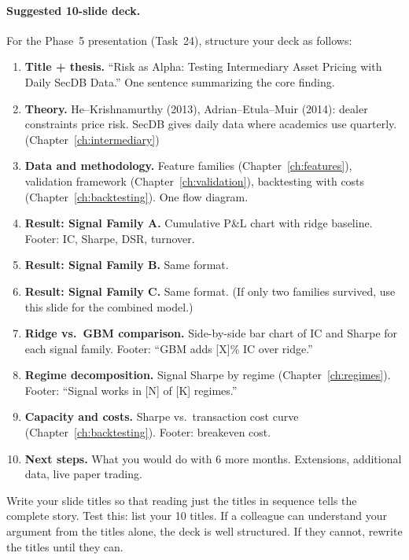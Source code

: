 \paragraph{Suggested 10-slide deck.}
For the Phase~5 presentation (Task~24), structure your deck as follows:

\begin{enumerate}[leftmargin=1.5em]
  \item \textbf{Title + thesis.}  ``Risk as Alpha: Testing Intermediary
    Asset Pricing with Daily SecDB Data.''  One sentence summarizing the
    core finding.
  \item \textbf{Theory.}  He--Krishnamurthy (2013), Adrian--Etula--Muir
    (2014): dealer constraints price risk.  SecDB gives daily data where
    academics use quarterly.  (Chapter~\ref{ch:intermediary})
  \item \textbf{Data and methodology.}  Feature families
    (Chapter~\ref{ch:features}), validation framework
    (Chapter~\ref{ch:validation}), backtesting with costs
    (Chapter~\ref{ch:backtesting}).  One flow diagram.
  \item \textbf{Result: Signal Family A.}  Cumulative P\&L chart with
    ridge baseline.  Footer: IC, Sharpe, DSR, turnover.
  \item \textbf{Result: Signal Family B.}  Same format.
  \item \textbf{Result: Signal Family C.}  Same format.  (If only two
    families survived, use this slide for the combined model.)
  \item \textbf{Ridge vs.\ GBM comparison.}  Side-by-side bar chart of
    IC and Sharpe for each signal family.  Footer: ``GBM adds [X]\% IC
    over ridge.''
  \item \textbf{Regime decomposition.}  Signal Sharpe by regime
    (Chapter~\ref{ch:regimes}).  Footer: ``Signal works in [N] of [K]
    regimes.''
  \item \textbf{Capacity and costs.}  Sharpe vs.\ transaction cost curve
    (Chapter~\ref{ch:backtesting}).  Footer: breakeven cost.
  \item \textbf{Next steps.}  What you would do with 6 more months.
    Extensions, additional data, live paper trading.
\end{enumerate}

\begin{keyidea}
Write your slide titles so that reading just the titles in sequence tells
the complete story.  Test this: list your 10 titles.  If a colleague can
understand your argument from the titles alone, the deck is well
structured.  If they cannot, rewrite the titles until they can.
\end{keyidea}

